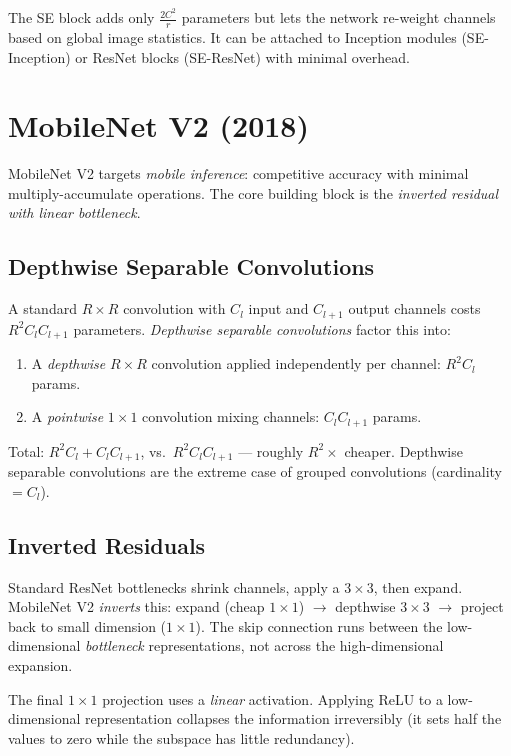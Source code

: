 \documentclass[11pt, oneside]{book}
\begin{document}
The SE block adds only $\frac{2C^2}{r}$ parameters but lets the network
re-weight channels based on global image statistics.
It can be attached to Inception modules (SE-Inception) or ResNet blocks (SE-ResNet)
with minimal overhead.

\section{MobileNet V2 (2018)}

MobileNet V2 targets \emph{mobile inference}: competitive accuracy with minimal
multiply-accumulate operations.
The core building block is the \emph{inverted residual with linear bottleneck}.

\subsection{Depthwise Separable Convolutions}

A standard $R\times R$ convolution with $C_l$ input and $C_{l+1}$ output channels
costs $R^2 C_l C_{l+1}$ parameters.
\emph{Depthwise separable convolutions} factor this into:
\begin{enumerate}
  \item A \emph{depthwise} $R\times R$ convolution applied independently per channel: $R^2 C_l$ params.
  \item A \emph{pointwise} $1\times1$ convolution mixing channels: $C_l C_{l+1}$ params.
\end{enumerate}
Total: $R^2 C_l + C_l C_{l+1}$, vs.\ $R^2 C_l C_{l+1}$ — roughly $R^2 \times$ cheaper.
Depthwise separable convolutions are the extreme case of grouped convolutions
(cardinality $= C_l$).

\subsection{Inverted Residuals}

Standard ResNet bottlenecks shrink channels, apply a $3\times3$, then expand.
MobileNet V2 \emph{inverts} this: expand (cheap $1\times1$) $\to$ depthwise $3\times3$
$\to$ project back to small dimension ($1\times1$).
The skip connection runs between the low-dimensional \emph{bottleneck} representations,
not across the high-dimensional expansion.

\begin{notebox}[title={No ReLU after Bottleneck Projection}]
The final $1\times1$ projection uses a \emph{linear} activation.
Applying ReLU to a low-dimensional representation collapses the information irreversibly
(it sets half the values to zero while the subspace has little redundancy).
\end{notebox}
\end{document}
